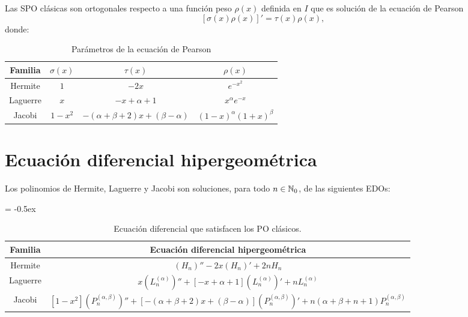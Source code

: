 Las SPO clásicas son ortogonales respecto a una función peso $\rho(x)$ definida en $I$ que es solución de la ecuación de Pearson
$$
[\sigma(x)\rho(x)]'=\tau(x)\rho(x),
$$
donde:


\begin{table}[h]
    \centering
    \begin{tabular}{cccc}
    \hline
    \textbf{Familia} & \textbf{$\sigma(x)$} & \textbf{$\tau(x)$} & \textbf{$\rho(x)$}            \\ \hline\hline
    Hermite          & $1$                  & $-2x$                               & $e^{-x^2}$                    \\ \hline
    Laguerre         & $x$                  & $-x+\alpha+1$                       & $x^{\alpha} e^{-x}$           \\ \hline
    Jacobi           & $1-x^2$              & $-(\alpha+\beta+2)x+(\beta-\alpha)$ & $(1-x)^{\alpha}(1+x)^{\beta}$ \\ \hline
    \end{tabular}
    \caption{Parámetros de la ecuación de Pearson}
    \label{tab:Pearson}
\end{table}

\section{Ecuación diferencial hipergeométrica}

Los polinomios de Hermite, Laguerre y Jacobi son soluciones, para todo $n\in\mathbb{N}_0$, de las siguientes EDOs:

\begin{table}[h]
    \centering
    \extrarowheight = -0.5ex
    \renewcommand{\arraystretch}{1.5}
    \begin{tabular}{cc}
    \hline
    \textbf{Familia} & \textbf{Ecuación diferencial hipergeométrica}                                                                                                 \\ \hline\hline
    Hermite          & $(H_n)'' -2x(H_n)' +2nH_n$                                                                                                           \\[5pt] \hline
    Laguerre         & $x(L_n^{(\alpha)})''+[-x+\alpha+1](L_n^{(\alpha)})' +nL_n^{(\alpha)}$                                                                 \\[5pt] \hline
    Jacobi           & $[1-x^2](P_n^{(\alpha,\beta)})''+[-(\alpha+\beta+2)x+(\beta-\alpha)](P_n^{(\alpha,\beta)})'+n(\alpha+\beta+n+1)P_n^{(\alpha,\beta)}$ \\[5pt] \hline
    \end{tabular}
    \caption{Ecuación diferencial que satisfacen los PO clásicos.}
    \label{tab:EDO}
    \end{table}

